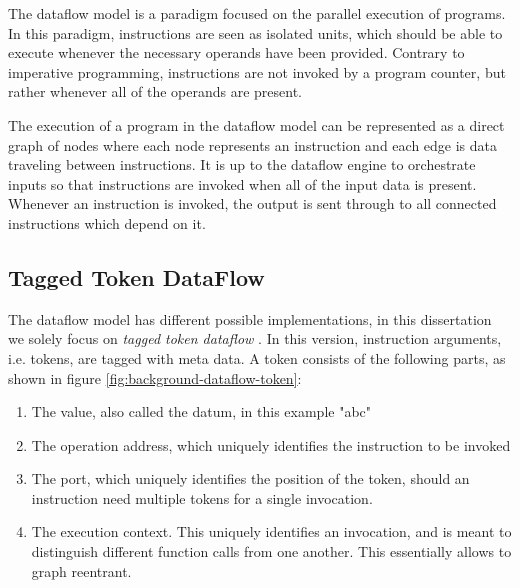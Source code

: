 The dataflow model \citep{johnston_advances_2004} is a paradigm focused on the parallel execution of programs. In this paradigm, instructions are seen as isolated units, which should be able to execute whenever the necessary operands have been provided. Contrary to imperative programming, instructions are not invoked by a program counter, but rather whenever all of the operands are present. 

The execution of a program in the dataflow model can be represented as a direct graph of nodes where each node represents an instruction and each edge is data traveling between instructions. It is up to the dataflow engine to orchestrate inputs so that instructions are invoked when all of the input data is present. Whenever an instruction is invoked, the output is sent through to all connected instructions which depend on it.

\subsection{Tagged Token DataFlow}

The dataflow model has different possible implementations, in this dissertation we solely focus on \textit{tagged token dataflow} \citep{arvind_executing_1990}.
In this version, instruction arguments, i.e. tokens, are tagged with meta data. A token consists of the following parts, as shown in figure \ref{fig:background-dataflow-token}:

\begin{enumerate}
	\item The value, also called the datum, in this example "abc"
	\item The operation address, which uniquely identifies the instruction to be invoked
	\item The port, which uniquely identifies the position of the token, should an instruction need multiple tokens for a single invocation.
	\item The execution context. This uniquely identifies an invocation, and is meant to distinguish different function calls from one another. This essentially allows to graph reentrant. 
\end{enumerate}


